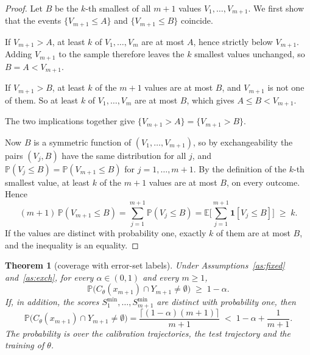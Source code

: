 \documentclass[10pt,a4paper]{article}
\newtheorem{theorem}{Theorem}
\theoremstyle{definition}
\theoremstyle{remark}
\newcommand{\Prob}{\mathbb{P}}
\newcommand{\E}{\mathbb{E}}
\newcommand{\ind}{\mathbf{1}}
\newcommand{\C}{C}
\newcommand{\Smin}{S^{\min}}
\begin{document}
\begin{proof}
Let $B$ be the $k$-th smallest of all $m+1$ values $V_1,\dots,V_{m+1}$. We first show that the events $\{V_{m+1}\le A\}$ and $\{V_{m+1}\le B\}$ coincide.

If $V_{m+1}>A$, at least $k$ of $V_1,\dots,V_m$ are at most $A$, hence strictly below $V_{m+1}$. Adding $V_{m+1}$ to the sample therefore leaves the $k$ smallest values unchanged, so $B=A<V_{m+1}$.

If $V_{m+1}>B$, at least $k$ of the $m+1$ values are at most $B$, and $V_{m+1}$ is not one of them. So at least $k$ of $V_1,\dots,V_m$ are at most $B$, which gives $A\le B<V_{m+1}$.

The two implications together give $\{V_{m+1}>A\}=\{V_{m+1}>B\}$.

Now $B$ is a symmetric function of $(V_1,\dots,V_{m+1})$, so by exchangeability the pairs $(V_j,B)$ have the same distribution for all $j$, and $\Prob(V_j\le B)=\Prob(V_{m+1}\le B)$ for $j=1,\dots,m+1$. By the definition of the $k$-th smallest value, at least $k$ of the $m+1$ values are at most $B$, on every outcome. Hence
\[
(m+1)\,\Prob(V_{m+1}\le B)=\sum_{j=1}^{m+1}\Prob(V_j\le B)=\E\Big[\sum_{j=1}^{m+1}\ind[V_j\le B]\Big]\;\ge\;k .
\]
If the values are distinct with probability one, exactly $k$ of them are at most $B$, and the inequality is an equality.
\end{proof}

\begin{theorem}[coverage with error-set labels] \label{thm:coverage}
Under Assumptions~\ref{as:fixed} and~\ref{as:exch}, for every $\alpha\in(0,1)$ and every $m\ge1$,
\begin{equation}
\Prob\big(\C_\theta(x_{m+1})\cap Y_{m+1}\neq\emptyset\big)\;\ge\;1-\alpha . \label{eq:lower}
\end{equation}
If, in addition, the scores $\Smin_1,\dots,\Smin_{m+1}$ are distinct with probability one, then
\begin{equation}
\Prob\big(\C_\theta(x_{m+1})\cap Y_{m+1}\neq\emptyset\big)=\frac{\lceil(1-\alpha)(m+1)\rceil}{m+1}\;<\;1-\alpha+\frac{1}{m+1}. \label{eq:upper}
\end{equation}
The probability is over the calibration trajectories, the test trajectory and the training of $\theta$.
\end{theorem}
\end{document}
